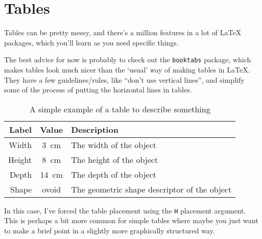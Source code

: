 
\section{Tables}\label{sec:exmapletables}

Tables can be pretty messy, and there's a million features in a lot of \LaTeX{} packages, which you'll learn as you need specific things.

The best advice for now is probably to check out the \texttt{booktabs} package, which makes tables look much nicer than the `usual' way of making tables in \LaTeX{}. They have a few guidelines/rules, like ``don't use vertical lines'', and simplify some of the process of putting the horizontal lines in tables.

\begin{table}[H]
    \caption[Example Table]{A simple example of a table to describe something}
    \label{tab:example}
    \begin{center}
        \begin{tabular}{r c p{11em}}
            \toprule
            \textbf{Label} & \textbf{Value} & \textbf{Description} \\
            \midrule[1pt]
            Width & 3~cm & The width of the object \\
            Height & 8~cm & The height of the object \\
            Depth & 14~cm & The depth of the object \\
            \midrule
            Shape & ovoid & The geometric shape descriptor of the object \\
            \bottomrule
        \end{tabular}
    \end{center}
\end{table}

In this case, I've forced the table placement using the \texttt{H} placement argument. This is perhaps a bit more common for simple tables where maybe you just want to make a brief point in a slightly more graphically structured way.

